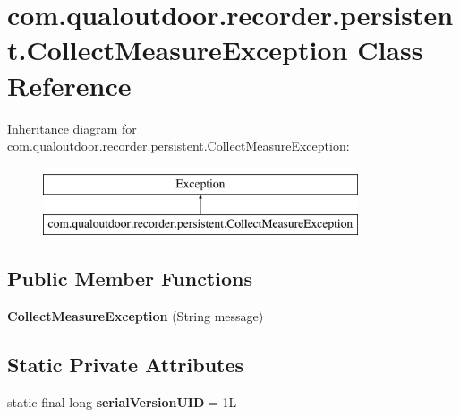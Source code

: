 \hypertarget{classcom_1_1qualoutdoor_1_1recorder_1_1persistent_1_1CollectMeasureException}{\section{com.\-qualoutdoor.\-recorder.\-persistent.\-Collect\-Measure\-Exception Class Reference}
\label{classcom_1_1qualoutdoor_1_1recorder_1_1persistent_1_1CollectMeasureException}
}
Inheritance diagram for com.\-qualoutdoor.\-recorder.\-persistent.\-Collect\-Measure\-Exception\-:\begin{figure}[H]
\begin{center}
\leavevmode
\includegraphics[height=2.000000cm]{classcom_1_1qualoutdoor_1_1recorder_1_1persistent_1_1CollectMeasureException}
\end{center}
\end{figure}
\subsection*{Public Member Functions}
\begin{DoxyCompactItemize}
\item 
\hypertarget{classcom_1_1qualoutdoor_1_1recorder_1_1persistent_1_1CollectMeasureException_aeec8833234a80c3db9e90dfc0d63e63e}{{\bfseries Collect\-Measure\-Exception} (String message)}\label{classcom_1_1qualoutdoor_1_1recorder_1_1persistent_1_1CollectMeasureException_aeec8833234a80c3db9e90dfc0d63e63e}

\end{DoxyCompactItemize}
\subsection*{Static Private Attributes}
\begin{DoxyCompactItemize}
\item 
\hypertarget{classcom_1_1qualoutdoor_1_1recorder_1_1persistent_1_1CollectMeasureException_ae5cbf307ec4186047eeb49b5796fa36c}{static final long {\bfseries serial\-Version\-U\-I\-D} = 1\-L}\label{classcom_1_1qualoutdoor_1_1recorder_1_1persistent_1_1CollectMeasureException_ae5cbf307ec4186047eeb49b5796fa36c}

\end{DoxyCompactItemize}


